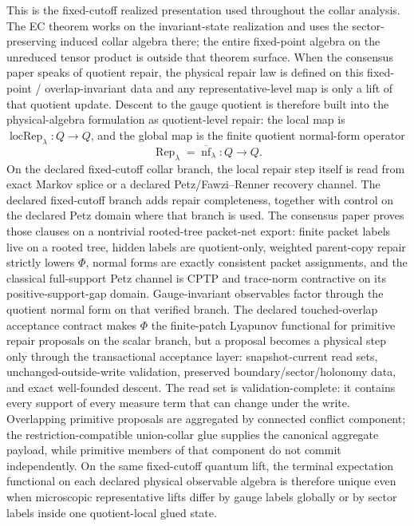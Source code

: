 This is the fixed-cutoff realized presentation used throughout the collar analysis. The EC theorem works on the invariant-state realization and uses the sector-preserving induced collar algebra there; the entire fixed-point algebra on the unreduced tensor product is outside that theorem surface.
When the consensus paper speaks of quotient repair, the physical repair law is defined on
this fixed-point / overlap-invariant data and any representative-level map is only a lift of that
quotient update. Descent to the gauge quotient is therefore built into the physical-algebra
formulation as quotient-level repair: the local map is
\(\operatorname{locRep}_\lambda:Q\to Q\), and the global map is the finite quotient
normal-form operator
\[
\operatorname{Rep}_\lambda=\overline{\operatorname{nf}}_\lambda:Q\to Q.
\]
On the
declared fixed-cutoff collar branch, the local repair step itself is read from exact Markov splice
or a declared Petz/Fawzi--Renner recovery channel. The declared fixed-cutoff branch adds
repair completeness, together with control on the declared Petz domain
where that branch is used. The consensus paper proves those clauses on a nontrivial rooted-tree
packet-net export: finite packet labels live on a rooted tree, hidden labels are quotient-only,
weighted parent-copy repair strictly lowers \(\Phi\), normal forms are exactly consistent packet
assignments, and the classical full-support Petz channel is CPTP and trace-norm contractive on
its positive-support-gap domain. Gauge-invariant observables factor through the quotient normal
form on that verified branch. The declared touched-overlap acceptance contract makes \(\Phi\) the
finite-patch Lyapunov functional for primitive repair proposals on the scalar branch, but a
proposal becomes a physical step only through the transactional acceptance layer: snapshot-current
read sets, unchanged-outside-write validation, preserved boundary/sector/holonomy data, and exact
well-founded descent. The read set is validation-complete: it contains every support of every
measure term that can change under the write. Overlapping primitive proposals are aggregated by connected conflict
component; the restriction-compatible union-collar glue supplies the canonical aggregate payload,
while primitive members of that component do not commit independently. On the same fixed-cutoff
quantum lift, the terminal expectation functional on each declared physical observable algebra is
therefore unique even when microscopic representative lifts differ by gauge labels globally or by
sector labels inside one quotient-local glued state.
